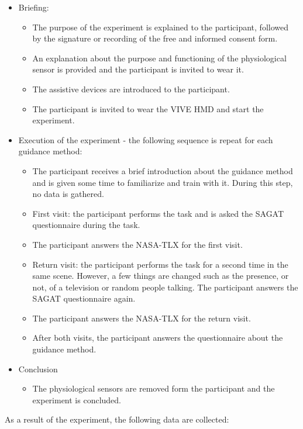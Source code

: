 \begin{itemize}
    \item Briefing:
    \begin{itemize}
        \item The purpose of the experiment is explained to the participant, followed by the signature or recording of the free and informed consent form.
        \item An explanation about the purpose and functioning of the physiological sensor is provided and the participant is invited to wear it.
        \item The assistive devices are introduced to the participant.
        \item The participant is invited to wear the VIVE HMD and start the experiment. 
    \end{itemize}
    \item Execution of the experiment - the following sequence is repeat for each guidance method:
    \begin{itemize}
        \item The participant receives a brief introduction about the guidance method and is given some time to familiarize and train with it. During this step, no data is gathered. 
        \item First visit: the participant performs the task and is asked the SAGAT questionnaire during the task.
        \item The participant answers the NASA-TLX for the first visit.
        \item Return visit: the participant performs the task for a second time in the same scene. However, a few things are changed such as the presence, or not, of a television or random people talking. The participant answers the SAGAT questionnaire again.
        \item The participant answers the NASA-TLX for the return visit.
        \item After both visits, the participant answers the questionnaire about the guidance method.
    \end{itemize}
    \item Conclusion
    \begin{itemize}
        \item The physiological sensors are removed form the participant and the experiment is concluded.
    \end{itemize}
\end{itemize}

As a result of the experiment, the following data are collected:

